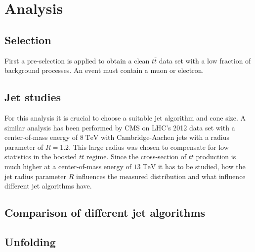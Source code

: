 \section{Analysis}
\subsection{Selection}
	First a pre-selection is applied to obtain a clean $t\bar{t}$ data set with a low fraction of background processes. An event must contain a muon or electron.
\subsection{Jet studies}
	For this analysis it is crucial to choose a suitable jet algorithm and cone size. A similar analysis has been performed by CMS on LHC's 2012 data set with a center-of-mass energy of $8\;\text{TeV}$ with Cambridge-Aachen jets with a radius parameter of $R=1.2$. This large radius was chosen to compensate for low statistics in the boosted $t\bar{t}$ regime. Since the cross-section of $t\bar{t}$ production is much higher at a center-of-mass energy of $13\;\text{TeV}$ it has to be studied, how the jet radius parameter $R$ influences the measured distribution and what influence different jet algorithms have.
\subsection{Comparison of different jet algorithms}
\subsection{Unfolding}